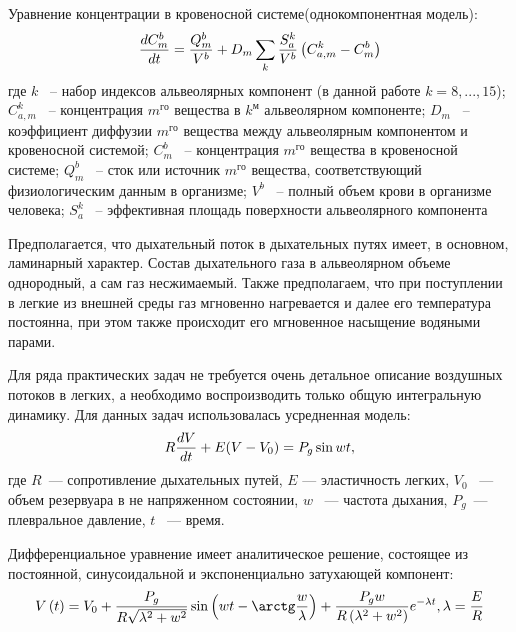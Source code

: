 Уравнение концентрации в кровеносной системе(однокомпонентная модель):
\begin{equation} 
\frac{dC_{m}^{b} }{dt} =\frac{Q_{m}^{b} }{V^{b} } +D_{m} \sum _{k}\frac{S_{a}^{k} }{V^{b} } \left(C_{a,m}^{k} -C_{m}^{b} \right)\notag  
\end{equation}
где $k$ ~-- набор индексов альвеолярных компонент (в данной работе $k=8,...,15$); $C_{a,m}^{k} $ ~-- концентрация $m^{го} $  вещества в $k^{м} $ альвеолярном компоненте; $D_{m} $ ~-- коэффициент диффузии $m^{го} $ вещества между альвеолярным компонентом и кровеносной системой; $C_{m}^{b} $  ~-- концентрация $m^{го} $ вещества в кровеносной системе; $Q_{m}^{b} $ ~-- сток или источник $m^{го} $ вещества, соответствующий физиологическим данным в организме; $V^{b} $ ~-- полный объем крови в организме человека; $S_{a}^{k} $ ~-- эффективная площадь поверхности альвеолярного компонента

Предполагается, что дыхательный поток в дыхательных путях имеет, в основном, ламинарный характер. Состав дыхательного газа в альвеолярном объеме однородный, а сам газ несжимаемый. Также предполагаем, что при поступлении в легкие из внешней среды газ мгновенно нагревается и далее его температура постоянна, при этом также происходит его мгновенное насыщение водяными парами. 

Для ряда практических задач не требуется очень детальное описание воздушных потоков в легких, а необходимо воспроизводить только общую интегральную динамику. Для данных задач использовалась усредненная модель: 
\begin{equation}\label{AlvEq}
R\frac{dV}{dt}+E(V-V_{0})=P_{g}\sin wt, \notag
\end{equation}
\noindent где \( R\)~--- сопротивление дыхательных путей, \( E\) --- эластичность легких, \( V_{0}\) ~--- объем резервуара в не напряженном состоянии, \( w\) ~--- частота дыхания, \( P_{g}\)~---плевральное давление, \( t\) ~--- время. 

Дифференциальное уравнение имеет аналитическое решение, состоящее из постоянной, синусоидальной и экспоненциально затухающей компонент:
\begin{equation}\label{V_analyt}
V\left(t\right)=V_{0}+\frac{P_{g}}{R\sqrt{\lambda^2+w^2}}\sin \left( wt-\arctg\frac{w}{\lambda} \right)+\frac{P_{g}w}{R\left(\lambda^2+w^2\right)}e^{-\lambda t}, \lambda=\frac{E}{R} \notag
\end{equation}

